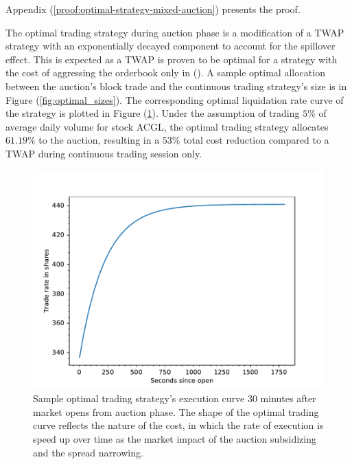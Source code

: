 \begin{remark}
  Appendix (\ref{proof:optimal-strategy-mixed-auction}) presents the proof.
\end{remark}

The optimal trading strategy during auction phase is a modification of a TWAP strategy with an exponentially decayed component to account for the spillover effect. This is expected as a TWAP is proven to be optimal for a strategy with the cost of aggressing the orderbook only in (\cite{Ho1981}). A sample optimal allocation between the auction's block trade and the continuous trading strategy's size is in Figure (\ref{fig:optimal_sizes}). The corresponding optimal liquidation rate curve of the strategy is plotted in Figure (\ref{fig:optimal_curve_strategy}). Under the assumption of trading $5\%$ of average daily volume for stock ACGL, the optimal trading strategy allocates $61.19 \%$ to the auction, resulting in a $53 \%$ total cost reduction compared to a TWAP during continuous trading session only.



\begin{figure}[h]
  \includegraphics[width=\textwidth]{images/SampleTradeCurve}
  \caption{Sample optimal trading strategy's execution curve 30 minutes after market opens from auction phase. The shape of the optimal trading curve reflects the nature of the cost, in which the rate of execution is speed up over time as the market impact of the auction subsidizing and the spread narrowing.}
  \label{fig:optimal_curve_strategy}
\end{figure}

